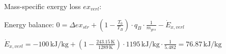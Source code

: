 Mass-specific exergy loss \( ex_{verl} \):  

Energy balance:  
\( 0 = \Delta ex_{str} + \left( 1 - \frac{T_0}{T_B} \right) \cdot q_B \cdot \frac{1}{\dot{m}_{ges}} - \dot{E}_{x,verl} \)  

\( \dot{E}_{x,verl} = -100 \, \text{kJ/kg} + \left( 1 - \frac{243.15 \, \text{K}}{1289 \, \text{K}} \right) \cdot 1195 \, \text{kJ/kg} \cdot \frac{1}{5.482} = 76.87 \, \text{kJ/kg} \)